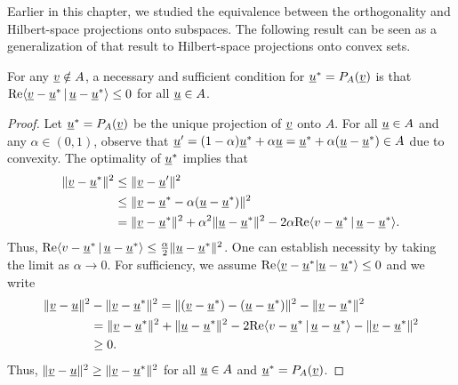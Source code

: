 Earlier in this chapter, we studied the equivalence between the orthogonality and Hilbert-space projections onto subspaces.
The following result can be seen as a generalization of that result to Hilbert-space projections onto convex sets.

\begin{theorem}
\label{theorem:convex_proj_lt0}
For any $\underline{v} \notin A$, a necessary and sufficient condition for $\underline{u}^* = P_A (\underline{v})$ is that $\mathrm{Re} \langle \underline{v}-\underline{u}^* \,|\, \underline{u}-\underline{u}^* \rangle \leq 0$ for all $\underline{u}\in A$.
\end{theorem}
\begin{proof}
Let $\underline{u}^* = P_A (\underline{v})$ be the unique projection of $\underline{v}$ onto $A$.
For all $\underline{u} \in A$ %
and any $\alpha\in (0,1)$, observe that $\underline{u}'=(1-\alpha) \underline{u}^* + \alpha \underline{u} = \underline{u}^* + \alpha (\underline{u}-\underline{u}^*)\in A$ due to convexity.
The optimality of $\underline{u}^*$ implies that
\begin{align*}
\| \underline{v}-\underline{u}^* \|^2
&\leq \| \underline{v}- \underline{u}' \|^2 \\
&\leq \| \underline{v}- \underline{u}^* - \alpha (\underline{u}-\underline{u}^*) \|^2 \\
&= \| \underline{v} - \underline{u}^* \|^2 + \alpha^2 \| \underline{u} - \underline{u}^* \|^2 - 2 \alpha \mathrm{Re} \langle v-\underline{u}^* \,|\, \underline{u}-\underline{u}^* \rangle. 
\end{align*}
Thus, $\mathrm{Re} \langle v-\underline{u}^* \,|\, \underline{u}-\underline{u}^* \rangle \leq \frac{\alpha}{2} \| \underline{u} - \underline{u}^* \|^2$.
One can establish necessity by taking the limit as $\alpha \to 0$.
For sufficiency, we assume $\mathrm{Re} \langle \underline{v}-\underline{u}^* | \underline{u}-\underline{u}^* \rangle \leq 0$ and we write
\begin{align*}
\| \underline{v}-\underline{u} \|^2 &- \| \underline{v} - \underline{u}^* \|^2
= \| (\underline{v} - \underline{u}^*) - (\underline{u} - \underline{u}^*) \|^2 - \|\underline{v} - \underline{u}^* \|^2 \\
&= \| \underline{v}-\underline{u}^* \|^2 + \| \underline{u} -\underline{u}^* \| ^2 - 2 \mathrm{Re} \langle v-\underline{u}^* \,|\, \underline{u}-\underline{u}^* \rangle - \|\underline{v}-\underline{u}^* \|^2 \\
&\geq 0.
\end{align*}
Thus, $\| \underline{v}-\underline{u} \|^2 \geq \| \underline{v} - \underline{u}^* \|^2$ for all $\underline{u} \in A$ and $\underline{u}^* = P_A (\underline{v})$.
\end{proof}

